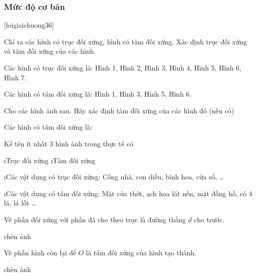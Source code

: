 \subsubsection*{Mức độ cơ bản}
[loigiaichuong36]
\begin{bt}
	Chỉ ra các hình có trục đối xứng, hình có tâm đối xứng. Xác định trục đối xứng và tâm đối xứng của các hình.
%	
%	
	\begin{loigiaichuong36}
		Các hình có trục đối xứng là: Hình 1, Hình 2, Hình 3, Hình 4, Hình 5, Hình 6, Hình 7.
		
		Các hình có tâm đối xứng là: Hình 1, Hình 3, Hình 5, Hình 6.
	\end{loigiaichuong36}
\end{bt}
\begin{bt}
	Cho các hình ảnh sau. Hãy xác định tâm đối xứng của các hình đó (nếu có)
	\begin{loigiaichuong36}
		Các hình có tâm đối xứng là:
	\end{loigiaichuong36}
\end{bt}
\begin{bt}
	Kể tên ít nhất 3 hình ảnh trong thực tế có
	\begin{enumerate}[a), leftmargin=*]
		\i Trục đối xứng
		\i Tâm đối xứng
	\end{enumerate}
	\begin{loigiaichuong36}
		\begin{enumerate}[a), leftmargin=*]
			\i Các vật dụng có trục đối xứng: Cổng nhà, con diều, bình  hoa, cửa sổ, \ldots
			
			\i Các vật dụng có tâm đối xứng: Mặt của thớt, ạch hoa lát nền, mặt đồng hồ, cỏ 4 lá, lá lốt \ldots
		\end{enumerate}
	\end{loigiaichuong36}
\end{bt}
\begin{bt}
	Vẽ phần đối xứng với phần đã cho theo trục là đường thẳng $d$ cho trước.
	\begin{loigiaichuong36}
		chèn ảnh
	\end{loigiaichuong36}
\end{bt}
\begin{bt}
	Vẽ phần hình còn lại để $O$ là tâm đối xứng của hình tạo thành.
	\begin{loigiaichuong36}
		chèn ảnh
	\end{loigiaichuong36}
\end{bt}
